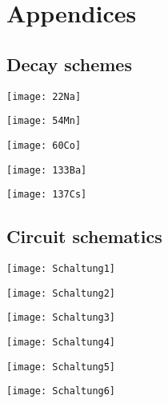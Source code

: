 \section{Appendices}
%
\subsection{Decay schemes}
%
\begin{multicolfloat}
\texttt{[image: 22Na]}
\label{fig:22NaDecayScheme}
\end{multicolfloat}
%
\begin{multicolfloat}
\texttt{[image: 54Mn]}
\label{fig:54MnDecayScheme}
\end{multicolfloat}
%
\begin{multicolfloat}
\texttt{[image: 60Co]}
\label{fig:60CoDecayScheme}
\end{multicolfloat}
%
\begin{multicolfloat}
\texttt{[image: 133Ba]}
\label{fig:133BaDecayScheme}
\end{multicolfloat}
%
\begin{multicolfloat}
\texttt{[image: 137Cs]}
\label{fig:137CsDecayScheme}
\end{multicolfloat}
%
\subsection{Circuit schematics}
%
\begin{multicolfloat}
\texttt{[image: Schaltung1]}
\label{fig:Schaltung1}
\end{multicolfloat}
%
\begin{multicolfloat}
\texttt{[image: Schaltung2]}
\label{fig:Schaltung2}
\end{multicolfloat}
%
\begin{multicolfloat}
\texttt{[image: Schaltung3]}
\label{fig:Schaltung3}
\end{multicolfloat}
%
\begin{multicolfloat}
\texttt{[image: Schaltung4]}
\label{fig:Schaltung4}
\end{multicolfloat}
%
\begin{multicolfloat}
\texttt{[image: Schaltung5]}
\label{fig:Schaltung5}
\end{multicolfloat}
%
\begin{multicolfloat}
\texttt{[image: Schaltung6]}
\label{fig:Schaltung6}
\end{multicolfloat}
